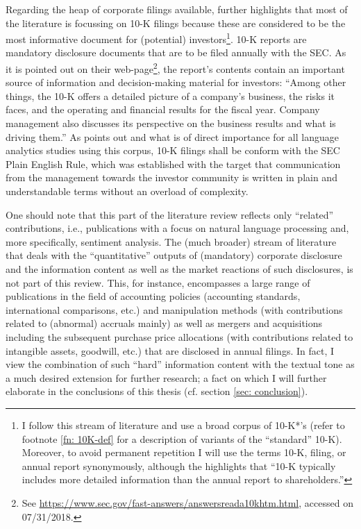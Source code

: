 Regarding the heap of corporate filings available, \textcite[227]{Das2014} further highlights that most of the literature is focussing on 10-K filings because these are considered to be the most informative document for (potential) investors\footnote{I follow this stream of literature and use a broad corpus of 10-K*'s (refer to footnote \ref{fn: 10K-def} for a description of variants of the \enquote{standard} 10-K). Moreover, to avoid permanent repetition I will use the terms 10-K, filing, or annual report synonymously, although the \textcite{SEC} highlights that \enquote{10-K typically includes more detailed information than the annual report to shareholders.}}. 10-K reports are mandatory disclosure documents that are to be filed annually with the SEC. As it is pointed out on their web-page\footnote{See \url{https://www.sec.gov/fast-answers/answersreada10khtm.html}, accessed on 07/31/2018.}, the report's contents contain an important source of information and decision-making material for investors: \enquote{Among other things, the 10-K offers a detailed picture of a company's business, the risks it faces, and the operating and financial results for the fiscal year. Company management also discusses its perspective on the business results and what is driving them.} As \textcite{Pulliza2015} points out and what is of direct importance for all language analytics studies using this corpus, 10-K filings shall be conform with the SEC Plain English Rule, which was established with the target that communication from the management towards the investor community is written in plain and understandable terms without an overload of complexity.

One should note that this part of the literature review reflects only \enquote{related} contributions, i.e., publications with a focus on natural language processing and, more specifically, sentiment analysis. The (much broader) stream of literature that deals with the \enquote{quantitative} outputs of (mandatory) corporate disclosure and the information content as well as the market reactions of such disclosures, is not part of this review. This, for instance, encompasses a large range of publications in the field of accounting policies (accounting standards, international comparisons, etc.) and manipulation methods (with contributions related to (abnormal) accruals mainly) as well as mergers and acquisitions including the subsequent purchase price allocations (with contributions related to intangible assets, goodwill, etc.) that are disclosed in annual filings. In fact, I view the combination of such \enquote{hard} information content with the textual tone as a much desired extension for further research; a fact on which I will further elaborate in the conclusions of this thesis (cf. section \ref{sec: conclusion}). 

